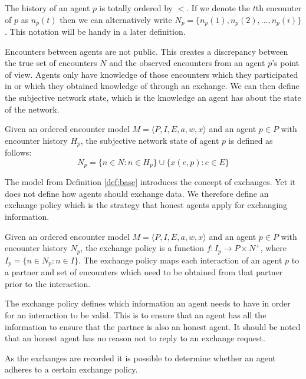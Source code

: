 The history of an agent $p$ is totally ordered by $<$. If we denote the 
$t$th encounter of $p$ as $n_p(t)$ then we can alternatively write $N_p = \{ n_p(1), n_p(2), ..., n_p(i)\}$.
This notation will be handy in a later definition.

Encounters between agents are not public. This creates a discrepancy between the true set of 
encounters $N$ and the observed encounters from an agent $p$'s point of view. Agents only have 
knowledge of those encounters which they participated in or which they obtained knowledge of through an exchange.
We can then define the subjective network state, which is the knowledge an agent has about the state of
the network.

\begin{defn}
    \label{def:subjective_network_state}
    Given an ordered encounter model $M = \langle P, I, E, a, w, x \rangle$ and an agent $p \in P$ with encounter history $H_p$, the subjective network state of agent $p$
    is defined as follows:
    \begin{equation}
        N_p = \{ n \in N : n \in H_p \} \cup \{ x(e, p) : e \in E \}
    \end{equation}
\end{defn}

The model from Definition \ref{def:base} introduces the concept of exchanges. Yet it does not define
how agents should exchange data. We therefore define an exchange policy which is the strategy that 
honest agents apply for exchanging information.

\begin{defn}
    Given an ordered encounter model $M = \langle P, I, E, a, w, x \rangle$ and an agent $p \in P$ with encounter history $N_p$,
    the exchange policy is a function $f : I_p \rightarrow P \times N^+$, where $I_p = \{ n \in N_p : n \in I\}$.
    The exchange policy maps each interaction of an agent $p$ to a partner and set of encounters 
    which need to be obtained from that partner prior to the interaction.
\end{defn}

The exchange policy defines which information an agent needs to have in order for an interaction to 
be valid. This is to ensure that an agent has all the information to ensure that the partner is also
an honest agent. It should be noted that an honest agent has no reason not to reply to an exchange 
request. 

As the exchanges are recorded it is possible to determine whether an agent adheres to a certain 
exchange policy. 

